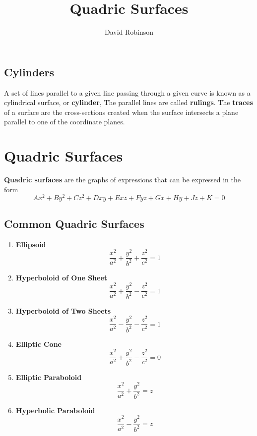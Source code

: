 \documentclass{article}
\title{Quadric Surfaces}
\author{David Robinson}
\date{}
\begin{document}
\maketitle

\subsection*{Cylinders}

A set of lines parallel to a given line passing through a given curve is known as a cylindrical surface, or \textbf{cylinder}, The parallel lines are called \textbf{rulings}. The \textbf{traces} of a surface are the cross-sections created when the surface intersects a plane parallel to one of the coordinate planes.

\section*{Quadric Surfaces}

\textbf{Quadric surfaces} are the graphs of expressions that can be expressed in the form
\[Ax^2 + By^2 + Cz^2 + Dxy + Exz + Fyz + Gx + Hy + Jz + K = 0\]

\subsection*{Common Quadric Surfaces}

\begin{enumerate}
    \item \textbf{Ellipsoid}
    \[\frac{x^2}{a^2} + \frac{y^2}{b^2} + \frac{z^2}{c^2} = 1\]
    \item \textbf{Hyperboloid of One Sheet}
    \[\frac{x^2}{a^2} + \frac{y^2}{b^2} - \frac{z^2}{c^2} = 1\]
    \item \textbf{Hyperboloid of Two Sheets}
    \[\frac{x^2}{a^2} - \frac{y^2}{b^2} - \frac{z^2}{c^2} = 1\]
    \item \textbf{Elliptic Cone}
    \[\frac{x^2}{a^2} + \frac{y^2}{b^2} - \frac{z^2}{c^2} = 0\]
    \item \textbf{Elliptic Paraboloid}
    \[\frac{x^2}{a^2} + \frac{y^2}{b^2} = z\]
    \item \textbf{Hyperbolic Paraboloid}
    \[\frac{x^2}{a^2} - \frac{y^2}{b^2} = z\]
\end{enumerate}
\end{document}
